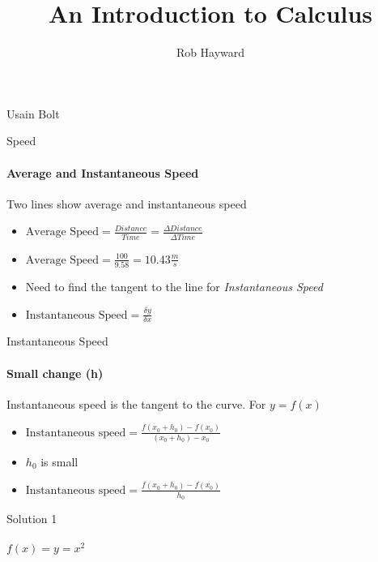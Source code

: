 \documentclass[14pt,xcolor=pdftex,dvipsnames,table]{beamer}
\title{An Introduction to Calculus}
\author{Rob Hayward}
\date{}
\begin{document}
\begin{frame}
\titlepage
\end{frame}


\begin{frame}{Usain Bolt}
\end{frame}

\begin{frame}{Speed}
\framesubtitle{Average and Instantaneous Speed}
Two lines show average and instantaneous speed
\pause
\begin{itemize}[<+-| alert@+>]
\item $\text{Average Speed} = \frac{Distance}{Time} = \frac{\Delta Distance}{\Delta Time}$
\item $\text{Average Speed} = \frac{100}{9.58} = 10.43\frac{m}{s}$
\item Need to find the tangent to the line for \emph{Instantaneous Speed}
\item $\text{Instantaneous Speed} = \frac{\delta y}{\delta x}$
\end{itemize}
\end{frame}

\begin{frame}{Instantaneous Speed}
\framesubtitle{Small change (h)}
Instantaneous speed is the tangent to the curve.  For $y = f(x)$
\pause
\begin{itemize}[<+-| alert@+>]
\item $\text{Instantaneous speed} = \frac{f(x_0 + h_0) - f(x_0)}{(x_0 +h_0) - 
x_0}$ 
\item $h_0$ is small
\item $\text{Instantaneous speed} = \frac{f(x_0 + h_0) - f(x_0)}{h_0}$
\end{itemize}
\end{frame}

\begin{frame}{Solution 1}
\framesubtitle{$f(x) = y = x^2$}
\end{frame}
\end{document}
